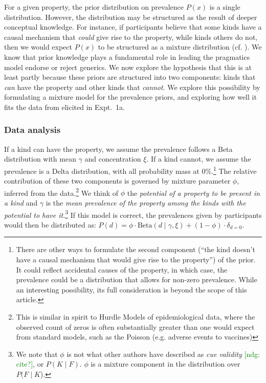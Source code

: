 \documentclass[12pt,letterpaper]{article}
\newcommand{\ndg}[1]{\textcolor{Green}{[ndg: #1]}}
\begin{document}
For a given property,  the prior distribution on prevalence $P(x)$ is a single distribution.
However, the distribution may be structured as the result of deeper conceptual knowledge. 
For instance, if participants believe that some kinds have a causal mechanism that \emph{could} give rise to the property, while kinds others do not, then we would expect $P(x)$ to be structured as a mixture distribution (cf. ).
We know that prior knowledge plays a fundamental role in leading the pragmatics model endorse or reject generics. 
We now explore the hypothesis that this is at least partly because these priors are structured into two components: kinds that \emph{can} have the property and other kinds that \emph{cannot}.
We explore this possibility by formulating a mixture model for the prevalence priors, and exploring how well it fits the data from elicited in Expt.~1a.
%

\subsubsection*{Data analysis}

If a kind can have the property, we assume the prevalence follows a Beta distribution with mean $\gamma$ and concentration $\xi$. 
If a kind cannot, we assume the prevalence is a Delta distribution, with all probability mass at 0\%.\footnote{There are other ways to formulate the second component (``the kind doesn't have a causal mechanism that would give rise to  the property'') of the prior. 
It could reflect accidental causes of the property, in which case, the prevalence could be a distribution that allows for non-zero prevalence. 
While an interesting possibility, its full consideration is beyond the scope of this article.
}
The relative contribution of these two components is governed by mixture parameter $\phi$, inferred from the data.\footnote{This is similar in spirit to Hurdle Models of epidemiological data, where the observed count of zeros is often substantially greater than one would expect from standard models, such as the Poisson (e.g. adverse events to vaccines)\cite{hurdleModels}}
We think of $\phi$ the \emph{potential of a property to be present in a kind} and $\gamma$ is the \emph{mean prevalence of the property among the kinds with the potential to have it}.\footnote{We note that $\phi$ is not what other authors have described as \emph{cue validity} \ndg{cite?}, or $P(K \mid F)$. 
$\phi$ is a mixture component in the distribution over $P(F\mid K$).
}
If this model is correct, the prevalences given by participants would then be distributed as: $P(d) = \phi \cdot \text{Beta}(d \mid \gamma,\xi)+ (1 - \phi) \cdot \delta_{d=0} $. 
\end{document}
